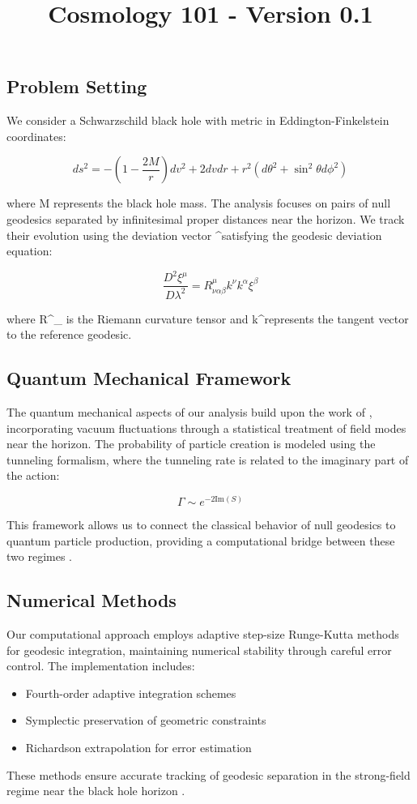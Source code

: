 \documentclass{article}\usepackage{graphicx} \usepackage{amsmath} \usepackage{colortbl}\title{Cosmology 101 - Version 0.1}
\begin{document}
\subsection{Problem Setting}
We consider a Schwarzschild black hole with metric in Eddington-Finkelstein coordinates:

\begin{equation}
ds^2 = -(1-\frac{2M}{r})dv^2 + 2dvdr + r^2(d\theta^2 + \sin^2\theta d\phi^2)
\end{equation}

where M represents the black hole mass. The analysis focuses on pairs of null geodesics separated by infinitesimal proper distances near the horizon. We track their evolution using the deviation vector \xi^\mu satisfying the geodesic deviation equation:

\begin{equation}
\frac{D^2\xi^\mu}{D\lambda^2} = R^\mu_{\nu\alpha\beta}k^\nu k^\alpha \xi^\beta
\end{equation}

where R^\mu_{\nu\alpha\beta} is the Riemann curvature tensor and k^\mu represents the tangent vector to the reference geodesic.

\subsection{Quantum Mechanical Framework}
The quantum mechanical aspects of our analysis build upon the work of \cite{unruh1981}, incorporating vacuum fluctuations through a statistical treatment of field modes near the horizon. The probability of particle creation is modeled using the tunneling formalism, where the tunneling rate \Gamma is related to the imaginary part of the action:

\begin{equation}
\Gamma \sim e^{-2\text{Im}(S)}
\end{equation}

This framework allows us to connect the classical behavior of null geodesics to quantum particle production, providing a computational bridge between these two regimes \cite{bekenstein1973}.

\subsection{Numerical Methods}
Our computational approach employs adaptive step-size Runge-Kutta methods for geodesic integration, maintaining numerical stability through careful error control. The implementation includes:

\begin{itemize}
\item Fourth-order adaptive integration schemes
\item Symplectic preservation of geometric constraints
\item Richardson extrapolation for error estimation
\end{itemize}

These methods ensure accurate tracking of geodesic separation in the strong-field regime near the black hole horizon \cite{visser1998}.
\end{document}
